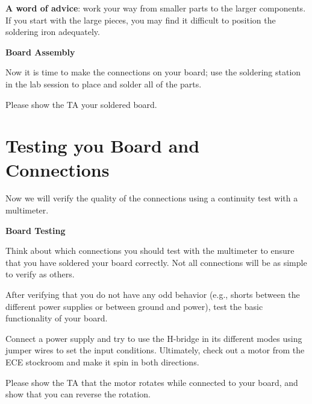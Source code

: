 \documentclass[openany,12pt,fleqn]{book} %
\begin{document}
\begin{warning}
\textbf{A word of advice}: work your way from smaller parts to the larger components. If you start with the large pieces, you may find it difficult to position the soldering iron adequately.
\end{warning}

\begin{exercise} \textbf{Board Assembly}
	
Now it is time to make the connections on your board; use the soldering station in the lab session to place and solder all of the parts.
\end{exercise}

\begin{assignment}
	Please show the TA your soldered board.
\end{assignment}

\section*{Testing you Board and Connections}
Now we will verify the quality of the connections using a continuity test with a multimeter.

\begin{exercise} \textbf{Board Testing}

Think about which connections you should test with the multimeter to ensure that you have soldered your board correctly. Not all connections will be as simple to verify as others.

After verifying that you do not have any odd behavior (e.g., shorts between the different power supplies or between ground and power), test the basic functionality of your board. 

Connect a power supply and try to use the H-bridge in its different modes using jumper wires to set the input conditions. Ultimately, check out a motor from the ECE stockroom and make it spin in both directions.
\end{exercise}

\begin{assignment}
	Please show the TA that the motor rotates while connected to your board, and show that you can reverse the rotation.
\end{assignment}
\end{document}
